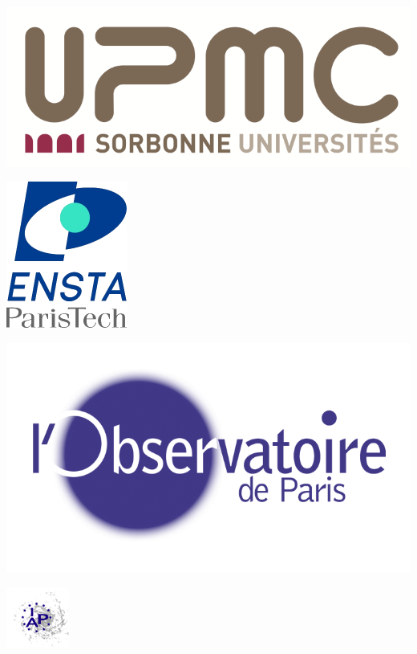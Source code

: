 \begin{titlepage}
	\begin{center}
		\begin{minipage}[c]{.1\linewidth}
			\centering \includegraphics[scale=0.2]{./logo/logoUPMC.png}
		\end{minipage} \hfill
		\begin{minipage}[c]{.3\linewidth}
			\centering \includegraphics[scale=0.2]{./logo/logo_ENSTA.png}
		\end{minipage}
		\hfill
		\begin{minipage}[c]{.18\linewidth}
			\centering \includegraphics[scale=0.1]{./logo/logo-obspm.png}
		\end{minipage}
		\hfill
		\begin{minipage}[c]{.18\linewidth}
			\centering \includegraphics[scale=0.5]{./logo/logo-iap.png}
		\end{minipage}


\end{center}
\end{titlepage}

